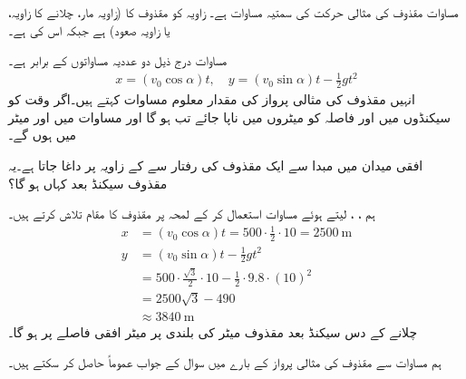 مساوات    مقذوف کی مثالی حرکت کی سمتیہ  مساوات ہے۔ زاویہ   کو  مقذوف کا     (زاویہ مار، چلانے  کا زاویہ، یا زاویہ صعود) ہے  جبکہ  اس کی  ہے۔

مساوات  درج ذیل دو عددیہ مساواتوں کے برابر ہے۔
\begin{align}\label{مساوات_سمتی_تفاعل_گولا_ث}
x=(v_0\cos\alpha)t,\quad y=(v_0\sin\alpha)t-\frac{1}{2}gt^2
\end{align}
انہیں   مقذوف کی مثالی پرواز  کی مقدار معلوم مساوات کہتے ہیں۔اگر وقت کو سیکنڈوں میں اور فاصلہ کو میٹروں میں ناپا جائے تب  ہو گا اور مساوات  میں  اور  میٹر میں ہوں گے۔

افقی میدان میں  مبدا سے ایک مقذوف  کی رفتار سے کے  زاویہ پر  داغا  جاتا ہے۔یہ مقذوف  سیکنڈ بعد کہاں  ہو گا؟

ہم ،    ،  لیتے ہوئے     مساوات  استعمال کر کے لمحہ  پر مقذوف  کا مقام تلاش  کرتے  ہیں۔
\begin{align*}
x&=(v_0\cos \alpha)t=500\cdot\frac{1}{2}\cdot 10=\SI{2500}{\meter}\\
y&=(v_0\sin\alpha)t-\frac{1}{2}gt^2\\
&=500\cdot\frac{\sqrt{3}}{2}\cdot 10-\frac{1}{2}\cdot 9.8\cdot(10)^2\\
&=2500\sqrt{3}-490\\
&\approx \SI{3840}{\meter}
\end{align*}
چلانے کے دس سیکنڈ بعد مقذوف    میٹر کی بلندی پر    میٹر  افقی فاصلے پر   ہو گا۔

ہم مساوات  سے  مقذوف کی مثالی  پرواز کے بارے میں  سوال کے جواب عموماً  حاصل کر سکتے ہیں۔

